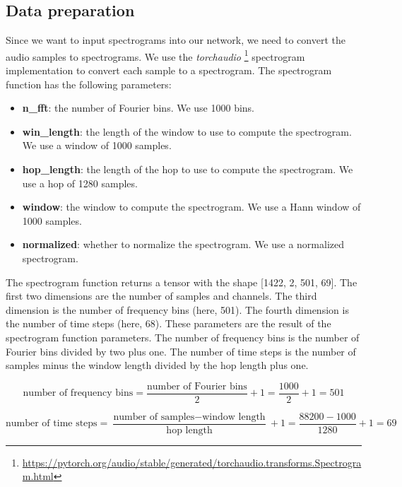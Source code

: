 \subsection{Data preparation}

Since we want to input spectrograms into our network, we need to convert the audio samples to spectrograms. We use the \textit{torchaudio} \footnote{\url{https://pytorch.org/audio/stable/generated/torchaudio.transforms.Spectrogram.html}} spectrogram implementation to convert each sample to a spectrogram. The spectrogram function has the following parameters:

\begin{itemize}
    \item \textbf{n\_fft}: the number of Fourier bins. We use 1000 bins.
    \item \textbf{win\_length}: the length of the window to use to compute the spectrogram. We use a window of 1000 samples.
    \item \textbf{hop\_length}: the length of the hop to use to compute the spectrogram. We use a hop of 1280 samples.
    \item \textbf{window}: the window to compute the spectrogram. We use a Hann window of 1000 samples.
    \item \textbf{normalized}: whether to normalize the spectrogram. We use a normalized spectrogram.
\end{itemize}

The spectrogram function returns a tensor with the shape [1422, 2, 501, 69]. The first two dimensions are the number of samples and channels. The third dimension is the number of frequency bins (here, 501). The fourth dimension is the number of time steps (here, 68). These parameters are the result of the spectrogram function parameters. The number of frequency bins is the number of Fourier bins divided by two plus one. The number of time steps is the number of samples minus the window length divided by the hop length plus one.

\begin{equation}
    \text{number of frequency bins} = \frac{\text{number of Fourier bins}}{2} + 1 = \frac{1000}{2} + 1 = 501
\end{equation}

\begin{equation}
    \text{number of time steps} = \frac{\text{number of samples} - \text{window length}}{\text{hop length}} + 1 = \frac{88200 - 1000}{1280} + 1 = 69
\end{equation}

